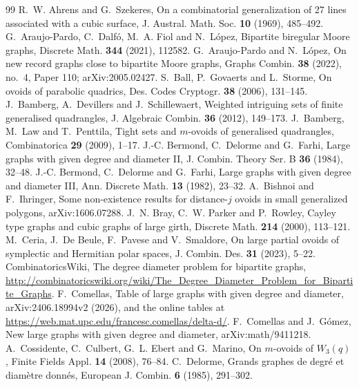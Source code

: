 \documentclass[11pt]{amsart}
\theoremstyle{definition}
\theoremstyle{remark}
\numberwithin{equation}{section}
\begin{document}


\begin{thebibliography}{99}
 R.~W. Ahrens and G.~Szekeres, On a combinatorial generalization of 27 lines associated with a cubic surface,
J. Austral. Math. Soc. \textbf{10} (1969), 485--492.
 G.~Araujo-Pardo, C.~Dalf\'o, M.~A. Fiol and N.~L\'opez, Bipartite biregular Moore graphs, Discrete Math.
\textbf{344} (2021), 112582.
 G.~Araujo-Pardo and N.~L\'opez, On new record graphs close to bipartite Moore graphs, Graphs Combin.
\textbf{38} (2022), no.~4, Paper 110; arXiv:2005.02427.
 S.~Ball, P.~Govaerts and L.~Storme, On ovoids of parabolic quadrics, Des. Codes Cryptogr. \textbf{38}
(2006), 131--145.
 J.~Bamberg, A.~Devillers and J.~Schillewaert, Weighted intriguing sets of finite generalised
quadrangles, J. Algebraic Combin. \textbf{36} (2012), 149--173.
 J.~Bamberg, M.~Law and T.~Penttila, Tight sets and $m$-ovoids of generalised quadrangles, Combinatorica
\textbf{29} (2009), 1--17.
 J.-C. Bermond, C.~Delorme and G.~Farhi, Large graphs with given degree and diameter II, J. Combin. Theory
Ser. B \textbf{36} (1984), 32--48.
 J.-C. Bermond, C.~Delorme and G.~Farhi, Large graphs with given degree and diameter III, Ann. Discrete Math.
\textbf{13} (1982), 23--32.
 A.~Bishnoi and F.~Ihringer, Some non-existence results for distance-$j$ ovoids in small generalized polygons,
arXiv:1606.07288.
 J.~N. Bray, C.~W. Parker and P.~Rowley, Cayley type graphs and cubic graphs of large girth, Discrete Math.
\textbf{214} (2000), 113--121.
 M.~Ceria, J.~De Beule, F.~Pavese and V.~Smaldore, On large partial ovoids of symplectic and Hermitian polar
spaces, J. Combin. Des. \textbf{31} (2023), 5--22.
 CombinatoricsWiki, The degree diameter problem for bipartite graphs,
\url{http://combinatoricswiki.org/wiki/The_Degree_Diameter_Problem_for_Bipartite_Graphs}.
 F.~Comellas, Table of large graphs with given degree and diameter, arXiv:2406.18994v2 (2026), and the online
tables at \url{https://web.mat.upc.edu/francesc.comellas/delta-d/}.
 F.~Comellas and J.~G\'omez, New large graphs with given degree and diameter, arXiv:math/9411218.
 A.~Cossidente, C.~Culbert, G.~L. Ebert and G.~Marino, On $m$-ovoids of $W_3(q)$, Finite Fields Appl.
\textbf{14} (2008), 76--84.
 C.~Delorme, Grands graphes de degr\'e et diam\`etre donn\'es, European J. Combin. \textbf{6} (1985), 291--302.

\end{thebibliography}
\end{document}
